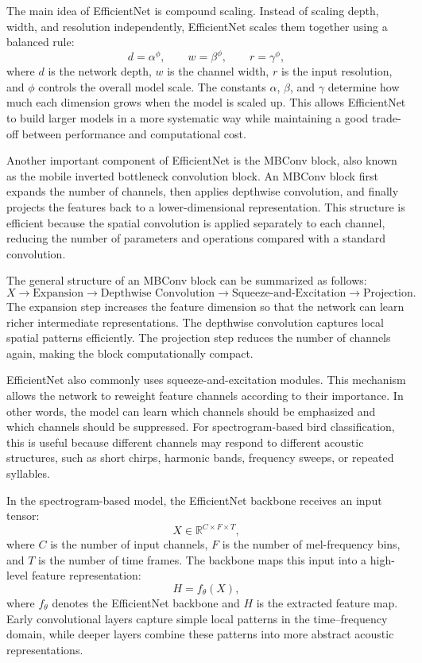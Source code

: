 \documentclass[a4paper,12pt]{article}
\begin{document}
The main idea of EfficientNet is compound scaling. Instead of scaling depth, width, and resolution independently, EfficientNet scales them together using a balanced rule:
\[
d = \alpha^{\phi},
\qquad
w = \beta^{\phi},
\qquad
r = \gamma^{\phi},
\]
where $d$ is the network depth, $w$ is the channel width, $r$ is the input resolution, and $\phi$ controls the overall model scale. The constants $\alpha$, $\beta$, and $\gamma$ determine how much each dimension grows when the model is scaled up. This allows EfficientNet to build larger models in a more systematic way while maintaining a good trade-off between performance and computational cost.

Another important component of EfficientNet is the MBConv block, also known as the mobile inverted bottleneck convolution block. An MBConv block first expands the number of channels, then applies depthwise convolution, and finally projects the features back to a lower-dimensional representation. This structure is efficient because the spatial convolution is applied separately to each channel, reducing the number of parameters and operations compared with a standard convolution.

The general structure of an MBConv block can be summarized as follows:
\[
X
\rightarrow
\text{Expansion}
\rightarrow
\text{Depthwise Convolution}
\rightarrow
\text{Squeeze-and-Excitation}
\rightarrow
\text{Projection}.
\]
The expansion step increases the feature dimension so that the network can learn richer intermediate representations. The depthwise convolution captures local spatial patterns efficiently. The projection step reduces the number of channels again, making the block computationally compact.

EfficientNet also commonly uses squeeze-and-excitation modules. This mechanism allows the network to reweight feature channels according to their importance. In other words, the model can learn which channels should be emphasized and which channels should be suppressed. For spectrogram-based bird classification, this is useful because different channels may respond to different acoustic structures, such as short chirps, harmonic bands, frequency sweeps, or repeated syllables.

In the spectrogram-based model, the EfficientNet backbone receives an input tensor:
\[
X \in \mathbb{R}^{C \times F \times T},
\]
where $C$ is the number of input channels, $F$ is the number of mel-frequency bins, and $T$ is the number of time frames. The backbone maps this input into a high-level feature representation:
\[
H = f_{\theta}(X),
\]
where $f_{\theta}$ denotes the EfficientNet backbone and $H$ is the extracted feature map. Early convolutional layers capture simple local patterns in the time--frequency domain, while deeper layers combine these patterns into more abstract acoustic representations.
\end{document}
